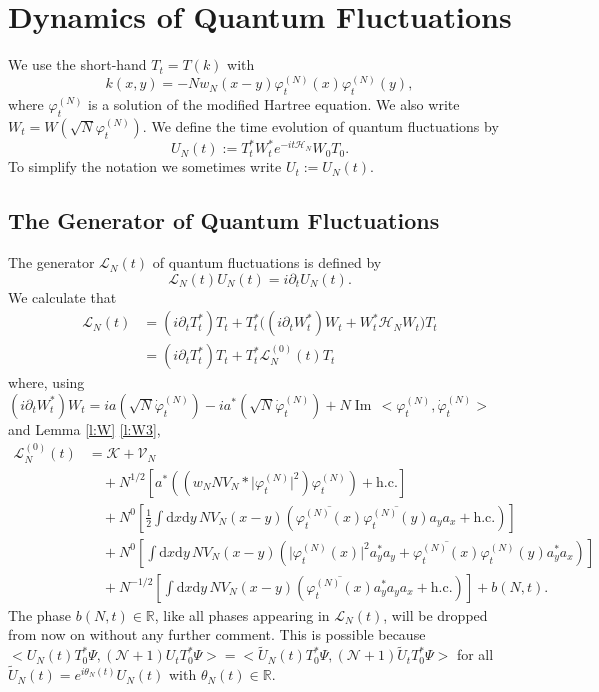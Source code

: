 \documentclass[11pt,a4paper,draft,DIV11]{scrartcl}	%
\newcommand{\di}{\textrm{d}}		%
\newcommand{\Lcal}{\mathcal{L}}		%
\newcommand{\Ncal}{\mathcal{N}}		%
\newcommand{\Kcal}{\mathcal{K}}		%
\newcommand{\Vcal}{\mathcal{V}}		%
\newcommand{\Hcal}{\mathcal{H}}		%
\newcommand{\hc}{\mbox{h.c.}}		%
\newcommand{\scal}[2]{\big<#1,#2\big>} %
\newcommand{\cc}[1]{\overline{#1}}	%
\newcommand{\Rbb}{\mathbb{R}}		%
\renewcommand{\Im}{\operatorname{Im}\,} 	%
\newcommand{\ph}{\varphi_t^{(N)}}	%
\newcommand{\phdot}{\dot{\varphi}_t^{(N)}}	%
\newcommand{\be}[1]{\begin{equation}\label{eq:#1}}	%
\newcommand{\ee}{\end{equation}}
\newcommand{\bd}{\begin{displaymath}}			%
\newcommand{\ed}{\end{displaymath}}
\begin{document}
\section{Dynamics of Quantum Fluctuations}
\label{s:fluctuations}
We use the short-hand $T_t = T(k)$ with
\bd
k(x,y) = - N w_N(x-y) \ph(x) \ph(y),
\ed
where $\ph$ is a solution of the modified Hartree equation. We also write $W_t = W(\sqrt{N}\ph)$.
We define the time evolution of quantum fluctuations by
\bd
U_N(t) := T^\ast_t W^\ast_t e^{-it \Hcal_N} W_0 T_0.
\ed
To simplify the notation we sometimes write $U_t := U_N(t)$.

\subsection{The Generator of Quantum Fluctuations}
\label{ss:generator}
The generator $\Lcal_N(t)$ of quantum fluctuations is defined by
\bd
\Lcal_N(t) U_N(t) = i \partial_t U_N(t).
\ed
We calculate that
\begin{align*}
\Lcal_N(t) 	& = (i \partial_t T^*_t) T_t + T^*_t \big( (i \partial_t W^*_t) W_t + W^*_t \Hcal_N W_t \big) T_t \\
		& = (i \partial_t T^*_t) T_t + T^*_t \Lcal^{(0)}_N(t) T_t
\end{align*}
where, using $(i \partial_t W^*_t) W_t = i a(\sqrt{N} \phdot) - i a^\ast(\sqrt{N}\phdot) + N \Im \scal{\ph}{\phdot}$ and Lemma \ref{l:W} \ref{l:W3},
\be{no3}
\begin{split}
\Lcal^{(0)}_N(t) & = \Kcal + \Vcal_N \\
		& \quad + N^{1/2} \left[  a^*\left( (w_N N V_N \ast \lvert \ph \rvert^2)\ph \right) + \hc  \right] \\
		& \quad + N^0	    \left[  \frac{1}{2}\int \di x \di y\, NV_N(x-y)\left( \cc{\ph(x)} \cc{\ph(y)} a_y a_x + \hc \right) \right] \\
		& \quad + N^0	    \left[  \int \di x \di y\, NV_N(x-y)\left( \lvert \ph(x) \rvert^2 a^*_y a_y + \cc{\ph(x)} \ph(y) a^*_y a_x \right) \right] \\
		& \quad + N^{-1/2}\left[  \int \di x \di y\, NV_N(x-y) \left( \cc{\ph(x)} a^*_y a_y a_x + \hc \right)  \right] + b(N,t).
\end{split}
\ee
The phase $b(N,t) \in \Rbb$, like all phases appearing in $\Lcal_N(t)$, will
be dropped from now on without any further comment. This is possible because $\scal{U_N(t)T^\ast_0 \Psi}{(\Ncal+1)U_t T_0^\ast \Psi} = \scal{\tilde U_N(t)T^\ast_0 \Psi}{(\Ncal+1)\tilde U_t T_0^\ast \Psi}$ for all $\tilde U_N(t) = e^{i\theta_N(t)} U_N(t)$ with $\theta_N(t) \in \Rbb$.
\end{document}
